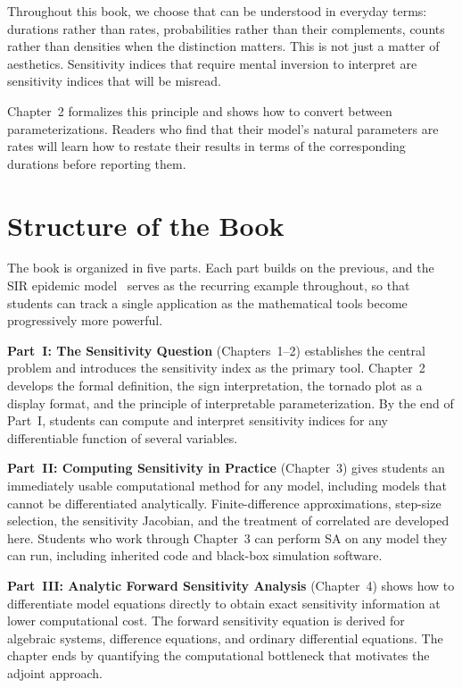 Throughout this book, we choose \POIs that can be understood
in everyday terms: durations rather than rates, probabilities
rather than their complements, counts rather than densities
when the distinction matters. This is not just a matter of
aesthetics. Sensitivity indices that require mental inversion
to interpret are sensitivity indices that will be misread.

Chapter~2 formalizes this principle and shows how to convert
between parameterizations. Readers who find that their model's
natural parameters are rates will learn how to restate
their results in terms of the corresponding durations
before reporting them.

\section{Structure of the Book}
\label{sec:structure}

The book is organized in five parts. Each part builds on
the previous, and the SIR epidemic model~\cite{kermack1927contribution,wu2013sensitivity} serves as the
recurring example throughout, so that students can track
a single application as the mathematical tools become
progressively more powerful.

\medskip

\textbf{Part~I: The Sensitivity Question} (Chapters~1--2)
establishes the central problem and introduces the sensitivity
index as the primary tool. Chapter~2 develops the formal
definition, the sign interpretation, the tornado plot
as a display format, and the principle of interpretable
parameterization. By the end of Part~I, students can compute
and interpret sensitivity indices for any differentiable
function of several variables.

\textbf{Part~II: Computing Sensitivity in Practice}
(Chapter~3) gives students an immediately usable computational
method for any model, including models that cannot be
differentiated analytically. Finite-difference approximations,
step-size selection, the sensitivity Jacobian, and the
treatment of correlated \POIs are developed here.
Students who work through Chapter~3 can perform SA on any
model they can run, including inherited code and black-box
simulation software.

\textbf{Part~III: Analytic Forward Sensitivity Analysis}
(Chapter~4) shows how to differentiate model equations directly
to obtain exact sensitivity information at lower computational
cost. The forward sensitivity equation is derived for algebraic
systems, difference equations, and ordinary differential
equations. The chapter ends by quantifying the computational
bottleneck that motivates the adjoint approach.

